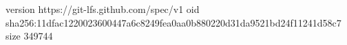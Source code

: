 version https://git-lfs.github.com/spec/v1
oid sha256:11dfac1220023600447a6c8249fea0aa0b880220d31da9521bd24f11241d58c7
size 349744

